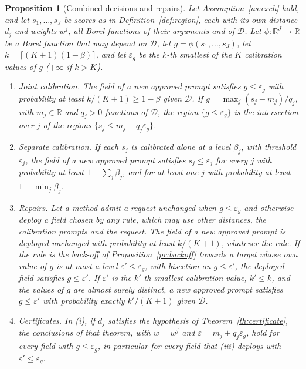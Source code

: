 \documentclass{article}
\newcommand{\RR}{\mathbb{R}}
\newcommand{\cD}{\mathcal{D}}
\theoremstyle{plain}
\newtheorem{proposition}[theorem]{Proposition}
\theoremstyle{remark}
\begin{document}
\begin{proposition}[Combined decisions and repairs]\label{pr:combined}
Let Assumption~\ref{as:exch} hold, and let $s_1,\dots,s_J$ be scores as in Definition~\ref{def:region}, each with its own distance
$d_j$ and weights $w^j$, all Borel functions of their arguments and of $\cD$. Let $\phi:\RR^J\to\RR$ be a Borel function that may
depend on $\cD$, let $g=\phi(s_1,\dots,s_J)$, let $k=\lceil(K+1)(1-\beta)\rceil$, and let $\varepsilon_g$ be the $k$-th smallest of
the $K$ calibration values of $g$ ($+\infty$ if $k>K$).
\begin{enumerate}[label=(\roman*)]
\item \emph{Joint calibration.} The field of a new approved prompt satisfies $g\le\varepsilon_g$ with probability at least
$k/(K+1)\ge1-\beta$ given $\cD$. If $g=\max_j(s_j-m_j)/q_j$, with $m_j\in\RR$ and $q_j>0$ functions of $\cD$, the region
$\{g\le\varepsilon_g\}$ is the intersection over $j$ of the regions $\{s_j\le m_j+q_j\varepsilon_g\}$.
\item \emph{Separate calibration.} If each $s_j$ is calibrated alone at a level $\beta_j$, with threshold $\varepsilon_j$, the field of
a new approved prompt satisfies $s_j\le\varepsilon_j$ for every $j$ with probability at least $1-\sum_j\beta_j$, and for at least one
$j$ with probability at least $1-\min_j\beta_j$.
\item \emph{Repairs.} Let a method admit a request unchanged when $g\le\varepsilon_g$ and otherwise deploy a field chosen by any rule,
which may use other distances, the calibration prompts and the request. The field of a new approved prompt is deployed unchanged
with probability at least $k/(K+1)$, whatever the rule. If the rule is the back-off of Proposition~\ref{pr:backoff} towards a target
whose own value of $g$ is at most a level $\varepsilon'\le\varepsilon_g$, with bisection on $g\le\varepsilon'$, the deployed field
satisfies $g\le\varepsilon'$. If $\varepsilon'$ is the $k'$-th smallest calibration value, $k'\le k$, and the values of $g$ are almost
surely distinct, a new approved prompt satisfies $g\le\varepsilon'$ with probability exactly $k'/(K+1)$ given $\cD$.
\item \emph{Certificates.} In (i), if $d_j$ satisfies the hypothesis of Theorem~\ref{th:certificate}, the conclusions of that theorem,
with $w=w^j$ and $\varepsilon=m_j+q_j\varepsilon_g$, hold for every field with $g\le\varepsilon_g$, in particular for every field that
(iii) deploys with $\varepsilon'\le\varepsilon_g$.
\end{enumerate}
\end{proposition}
\end{document}
